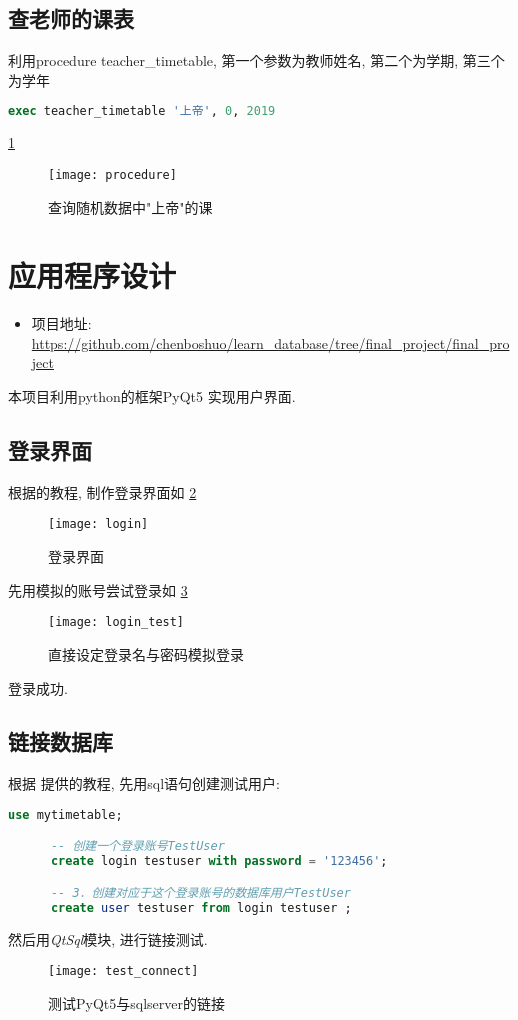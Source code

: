 \documentclass{myreport}
\begin{document}
  \subsection{查老师的课表}
    利用procedure teacher\_timetable, 第一个参数为教师姓名, 第二个为学期, 第三个为学年
    \begin{lstlisting}[language=sql]
      exec teacher_timetable '上帝', 0, 2019
    \end{lstlisting}
    \cref{fig:procedure}
    \begin{figure}[H]
      \centering
      \texttt{[image: procedure]}
      \caption{查询随机数据中"上帝"的课}
      \label{fig:procedure}
    \end{figure}
\section{应用程序设计}
  \begin{itemize}
    \item 项目地址:
    \url{https://github.com/chenboshuo/learn_database/tree/final_project/final_project}
  \end{itemize}
  本项目利用python的框架PyQt5  实现用户界面.

  \subsection{登录界面}
    根据\cite{pyqt5_login}的教程, 制作登录界面如
    \cref{fig:login}

    \begin{figure}[H]
      \centering
      \texttt{[image: login]}
      \caption{登录界面}
      \label{fig:login}
    \end{figure}
    先用模拟的账号尝试登录如
    \cref{fig:login_test}
    \begin{figure}[H]
      \centering
      \texttt{[image: login\_test]}
      \caption{直接设定登录名与密码模拟登录}
      \label{fig:login_test}
    \end{figure}
    登录成功.
  \subsection{链接数据库}
    根据 \cite{connect_database} 提供的教程, 先用sql语句创建测试用户:
    \begin{lstlisting}[language=sql]
      use mytimetable;

      -- 创建一个登录账号TestUser
      create login testuser with password = '123456';

      -- 3．创建对应于这个登录账号的数据库用户TestUser
      create user testuser from login testuser ;
    \end{lstlisting}
    然后用\emph{QtSql}模块, 进行链接测试.
    \begin{figure}[H]
      \centering
      \texttt{[image: test\_connect]}
      \caption{测试PyQt5与sqlserver的链接}
      \label{fig:test_connect}
    \end{figure}
\end{document}
